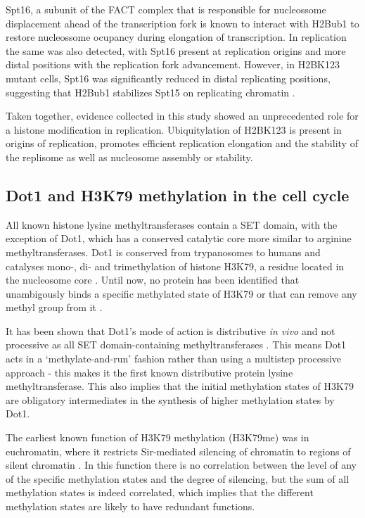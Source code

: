 \documentclass[11pt,twoside,a4paper]{report}
\begin{document}
		Spt16, a subunit of the FACT complex that is responsible for nucleossome displacement ahead of the transcription fork is known to interact with H2Bub1 to restore nucleossome ocupancy during elongation of transcription. In replication the same was also detected, with Spt16 present at replication origins and more distal positions with the replication fork advancement. However, in H2BK123 mutant cells, Spt16 was significantly reduced in distal replicating positions, suggesting that H2Bub1 stabilizes Spt15 on replicating chromatin \cite{Trujillo2012}.
		
		Taken together, evidence collected in this study \cite{Trujillo2012} showed an unprecedented role for a histone modification in replication. Ubiquitylation of H2BK123 is present in origins of replication, promotes efficient replication elongation and the stability of the replisome as well as nucleosome assembly or stability.
		
		\subsection{Dot1 and H3K79 methylation in the cell cycle}
	
		All known histone lysine methyltransferases contain a SET domain, with the exception of Dot1, which has a conserved catalytic core more similar to arginine methyltransferases. Dot1 is conserved from trypanosomes to humans and catalyses mono-, di- and trimethylation of histone H3K79, a residue located in the nucleosome core \cite{Kouzarides2007}. Until now, no protein has been identified that unambigously binds a specific methylated state of H3K79 or that can remove any methyl group from it \cite{Frederiks2008}.
		
		It has been shown that Dot1's mode of action is distributive \textit{in vivo} and not processive as all SET domain-containing methyltransferases \cite{Frederiks2008}. This means Dot1 acts in a ‘methylate-and-run’ fashion rather than using a multistep processive approach - this makes it the first known distributive protein lysine methyltransferase. This also implies that the initial methylation states of H3K79 are obligatory intermediates in the synthesis of higher methylation states by Dot1.
		
		The earliest known function of H3K79 methylation (H3K79me) was in euchromatin, where it restricts Sir-mediated silencing of chromatin to regions of silent chromatin \cite{Frederiks2008}. In this function there is no correlation between the level of any of the specific methylation states and the degree of silencing, but the sum of all methylation states is indeed correlated, which implies that the different methylation states are likely to have redundant functions.
		
\end{document}
